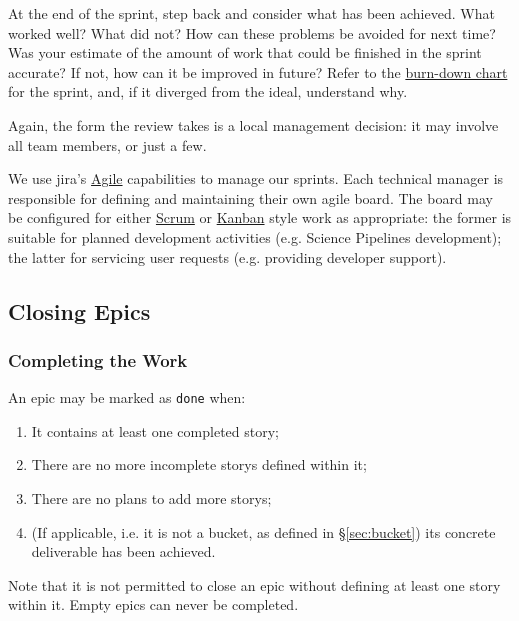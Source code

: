 \begin{enumerate}
  At the end of the sprint, step back and consider what has been
  achieved. What worked well? What did not? How can these problems be
  avoided for next time? Was your estimate of the amount of work that
  could be finished in the sprint accurate? If not, how can it be
  improved in future? Refer to the
  \href{https://en.wikipedia.org/wiki/Burn_down_chart}{burn-down chart}
  for the sprint, and, if it diverged from the ideal, understand why.

  Again, the form the review takes is a local management decision: it
  may involve all team members, or just a few.
\end{enumerate}

We use \gls{jira}'s
\href{https://www.atlassian.com/software/jira/agile}{Agile} capabilities
to manage our sprints. Each technical manager is responsible for
defining and maintaining their own agile board. The board may be
configured for either
\href{https://en.wikipedia.org/wiki/Scrum_(software_development)}{Scrum}
or \href{https://en.wikipedia.org/wiki/Kanban_(development)}{Kanban}
style work as appropriate: the former is suitable for planned
development activities (e.g. Science Pipelines development); the latter
for servicing user requests (e.g. providing developer support).

\subsection{Closing Epics}
\label{sec:epic-close}

\subsubsection{Completing the Work}
\label{sec:epic-done}

An \gls{epic} may be marked as \texttt{done} when:

\begin{enumerate}
\item
  It contains at least one completed \gls{story};
\item
  There are no more incomplete \glspl{story} defined within it;
\item
  There are no plans to add more \glspl{story};
\item
  (If applicable, i.e. it is not a bucket, as defined in \S\ref{sec:bucket}) its concrete deliverable has been achieved.
\end{enumerate}

Note that it is not permitted to close an \gls{epic} without defining at least one \gls{story} within it.
Empty \glspl{epic} can never be completed.

